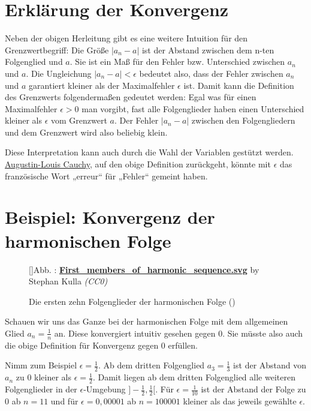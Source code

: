 \documentclass[fontsize=9pt,
               parskip=half-,
               DIV=14,
               listof=chapterentry,
               tocflat]{scrbook}
\newcounter{imagelabel}
\begin{document}
\section{Erklärung der Konvergenz}

Neben der obigen Herleitung gibt es eine weitere Intuition für den Grenzwertbegriff: Die Größe $|a_{n}-a|$ ist der Abstand zwischen dem n-ten Folgenglied und $a$. Sie ist ein Maß für den Fehler bzw. Unterschied zwischen $a_{n}$ und $a$. Die Ungleichung $|a_{n}-a|<\epsilon $ bedeutet also, dass der Fehler zwischen $a_{n}$ und $a$ garantiert kleiner als der Maximalfehler $\epsilon $ ist. Damit kann die Definition des Grenzwerts folgendermaßen gedeutet werden: Egal was für einen Maximalfehler $\epsilon >0$ man vorgibt, fast alle Folgenglieder haben einen Unterschied kleiner als $\epsilon $ vom Grenzwert $a$. Der Fehler $|a_{n}-a|$ zwischen den Folgengliedern und dem Grenzwert wird also beliebig klein.

Diese Interpretation kann auch durch die Wahl der Variablen gestützt werden. \href{https://de.wikipedia.org/wiki/Augustin-Louis\%20Cauchy}
{Augustin-Louis Cauchy}, auf den obige Definition zurückgeht, könnte mit $\epsilon $ das französische Wort „erreur“ für „Fehler“ gemeint haben.

\section{Beispiel: Konvergenz der harmonischen Folge}

\begin{figure}[h]
\vspace{\baselineskip}
[]{Abb. : \protect\href{https://commons.wikimedia.org/wiki/File:First_members_of_harmonic_sequence.svg}{\textbf{First\allowbreak\_members\allowbreak\_of\allowbreak\_harmonic\allowbreak\_sequence.svg}} by Stephan Kulla \textit{(CC0)}}\centering
{}
\caption*{Die ersten zehn Folgenglieder der harmonischen Folge ()}
\end{figure}
Schauen wir uns das Ganze bei der harmonischen Folge mit dem allgemeinen Glied $a_{n}={\tfrac {1}{n}}$ an. Diese konvergiert intuitiv gesehen gegen $0$. Sie müsste also auch die obige Definition für Konvergenz gegen $0$ erfüllen.

Nimm zum Beispiel $\epsilon ={\tfrac {1}{2}}$. Ab dem dritten Folgenglied $a_{3}={\tfrac {1}{3}}$ ist der Abstand von $a_{n}$ zu $0$ kleiner als $\epsilon ={\tfrac {1}{2}}$. Damit liegen ab dem dritten Folgenglied alle weiteren Folgenglieder in der $\epsilon $-Umgebung $]-{\tfrac {1}{2}},{\tfrac {1}{2}}[$. Für $\epsilon ={\tfrac {1}{10}}$ ist der Abstand der Folge zu $0$ ab $n=11$ und für $\epsilon =0,00001$ ab $n=100001$ kleiner als das jeweils gewählte $\epsilon $.
\end{document}
